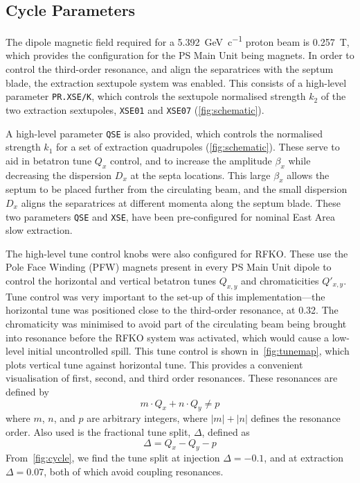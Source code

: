 \documentclass[11pt]{report}
\begin{document}
\subsection{Cycle Parameters}\label{sec:magcycle}

The dipole magnetic field required for a \qty[per-mode=symbol]{5.392}{\giga\electronvolt\per~c} proton beam is \qty{0.257}{\tesla}, which provides the configuration for the PS Main Unit being magnets. In order to control the third-order resonance, and align the separatrices with the septum blade, the extraction sextupole system was enabled. This consists of a high-level parameter \verb|PR.XSE/K|, which controls the sextupole normalised strength $k_2$ of the two extraction sextupoles, \verb|XSE01| and \verb|XSE07| (\autoref{fig:schematic}). 

A high-level parameter \verb|QSE| is also provided, which controls the normalised strength $k_1$ for a set of extraction quadrupoles (\autoref{fig:schematic}). These serve to aid in betatron tune $Q_x$ control, and to increase the amplitude $\beta_x$ while decreasing the dispersion $D_x$ at the septa locations. This large $\beta_x$ allows the septum to be placed further from the circulating beam, and the small dispersion $D_x$ aligns the separatrices at different momenta along the septum blade. These two parameters \verb|QSE| and \verb|XSE|, have been pre-configured for nominal East Area slow extraction. %

The high-level tune control knobs were also configured for RFKO. These use the Pole Face Winding (PFW) magnets present in every PS Main Unit dipole to control the horizontal and vertical betatron tunes $Q_{x, y}$ and chromaticities $Q'_{x, y}$. Tune control was very important to the set-up of this implementation---the horizontal tune was positioned close to the third-order resonance, at 0.32. The chromaticity was minimised to avoid part of the circulating beam being brought into resonance before the RFKO system was activated, which would cause a low-level initial uncontrolled spill. This tune control is shown in~\autoref{fig:tunemap}, which plots vertical tune against horizontal tune. This provides a convenient visualisation of first, second, and third order resonances. These resonances are defined by
\begin{equation}
  m\cdot Q_x+n\cdot Q_y\neq p
\end{equation} where $m$, $n$, and $p$ are arbitrary integers, where $|m|+|n|$ defines the resonance order. Also used is the fractional tune split, $\Delta$, defined as
\begin{equation}
  \Delta = Q_x-Q_y-p
\end{equation}
From~\autoref{fig:cycle}, we find the tune split at injection $\Delta=-0.1$, and at extraction $\Delta=0.07$, both of which avoid coupling resonances.
\end{document}
